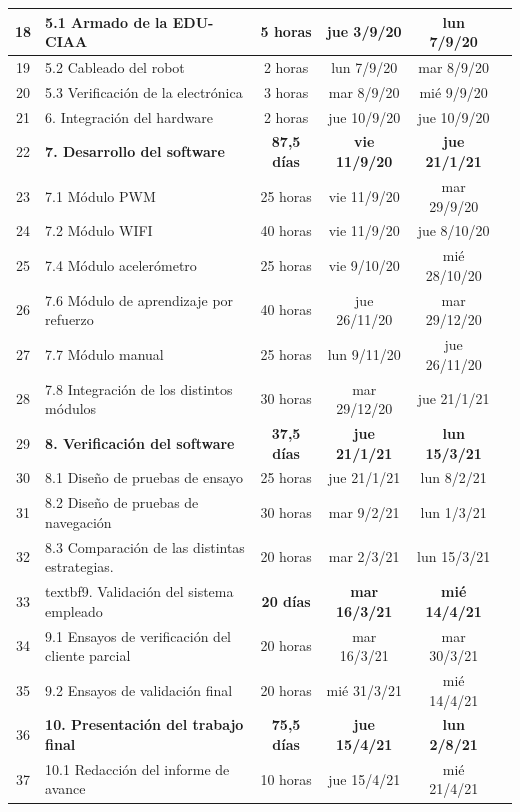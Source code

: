 \documentclass[
11pt, %
codirector, %
]{charter}
\begin{document}
\begin{table}[htbp]
{\begin{tabular}{|c|p{25em}|c|c|c|c|}
\hline 18 & 5.1 Armado de la EDU-CIAA & 5 horas & jue 3/9/20 & lun 7/9/20 &  \\
\hline 19 & 5.2 Cableado del robot & 2 horas & lun 7/9/20 & mar 8/9/20 &  \\
\hline 20 & 5.3 Verificación de la electrónica & 3 horas & mar 8/9/20 & mié 9/9/20 &  \\
\hline 21 & 6. Integración del hardware & 2 horas & jue 10/9/20 & jue 10/9/20 &  \\
\hline 22 & \textbf{7. Desarrollo del software} & \textbf{87,5 días} & \textbf{vie 11/9/20} & \textbf{jue 21/1/21} &  \\
\hline 23 & 7.1 Módulo PWM & 25 horas & vie 11/9/20 & mar 29/9/20 &  \\
\hline 24 & 7.2 Módulo WIFI & 40 horas & vie 11/9/20 & jue 8/10/20 &  \\
\hline 25 & 7.4 Módulo acelerómetro & 25 horas & vie 9/10/20 & mié 28/10/20 &  \\
\hline 26 & 7.6 Módulo de aprendizaje por refuerzo & 40 horas & jue 26/11/20 & mar 29/12/20 &  \\
\hline 27 & 7.7 Módulo manual & 25 horas & lun 9/11/20 & jue 26/11/20 &  \\
\hline 28 & 7.8 Integración de los distintos módulos & 30 horas & mar 29/12/20 & jue 21/1/21&  \\
\hline 29 & \textbf{8. Verificación del software} & \textbf{37,5 días} & \textbf{jue 21/1/21} & \textbf{lun 15/3/21} &  \\
\hline 30 & 8.1 Diseño de pruebas de ensayo & 25 horas & jue 21/1/21 & lun 8/2/21 &  \\
\hline 31 & 8.2 Diseño de pruebas de navegación & 30 horas & mar 9/2/21 & lun 1/3/21 &  \\
\hline 32 & 8.3 Comparación de las distintas estrategias. & 20 horas & mar 2/3/21 & lun 15/3/21 &  \\
\hline 33 & textbf{9. Validación del sistema empleado} & \textbf{20 días} & \textbf{mar 16/3/21} & \textbf{mié 14/4/21} &  \\
\hline 34 & 9.1 Ensayos de verificación del cliente parcial & 20 horas & mar 16/3/21 & mar 30/3/21 &  \\
\hline 35 & 9.2 Ensayos de validación final & 20 horas & mié 31/3/21 & mié 14/4/21 &  \\
\hline 36 & \textbf{10. Presentación del trabajo final} & \textbf{75,5 días} & \textbf{jue 15/4/21} & \textbf{lun 2/8/21} &  \\
\hline 37 & 10.1 Redacción del informe de avance & 10 horas & jue 15/4/21 & mié 21/4/21 &  \\

\end{tabular}}
\end{table}
\end{document}
